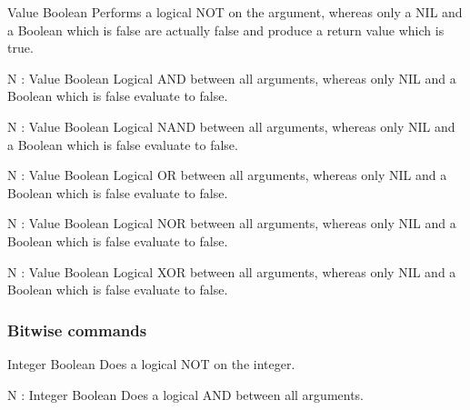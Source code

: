     \begin{commands}

                {Value}
                {Boolean}
                {
                    Performs a logical NOT on the argument, whereas only a NIL
                    and a Boolean which is false are actually false and produce
                    a return value which is true.
                }

                {N : Value}
                {Boolean}
                {
                    Logical AND between all arguments, whereas only NIL and a
                    Boolean which is false evaluate to false.
                }

                {N : Value}
                {Boolean}
                {
                    Logical NAND between all arguments, whereas only NIL and a
                    Boolean which is false evaluate to false.
                }

                {N : Value}
                {Boolean}
                {
                    Logical OR between all arguments, whereas only NIL and a
                    Boolean which is false evaluate to false.
                }

                {N : Value}
                {Boolean}
                {
                    Logical NOR between all arguments, whereas only NIL and a
                    Boolean which is false evaluate to false.
                }

                {N : Value}
                {Boolean}
                {
                    Logical XOR between all arguments, whereas only NIL and a
                    Boolean which is false evaluate to false.
                }

    \end{commands}

\subsubsection{Bitwise commands}

    \begin{commands}

                {Integer}
                {Boolean}
                {
                    Does a logical NOT on the integer.
                }

                {N : Integer}
                {Boolean}
                {
                    Does a logical AND between all arguments.
                }

    \end{commands}


